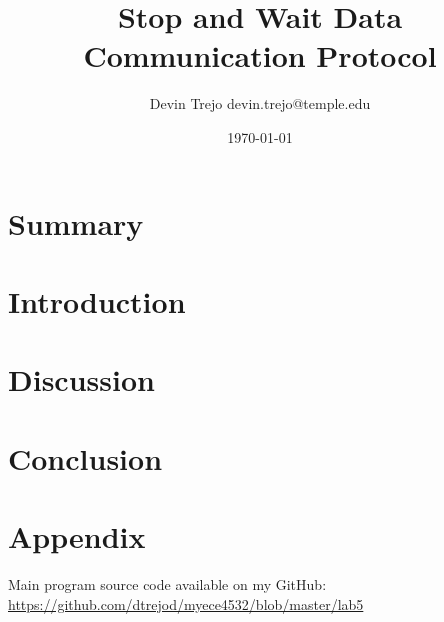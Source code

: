 \documentclass[12pt]{article}
\begin{document}
\title{Stop and Wait Data Communication Protocol}
\author{Devin Trejo \tabularnewline devin.trejo@temple.edu }
\date{\today}
\maketitle

\section{Summary}
\label{sect:summary}


\section{Introduction}
\label{sect:intro}


\section{Discussion}
\label{sect:discussion}



\section{Conclusion}
\label{sect:conclusion} 





\section*{Appendix}
\label{sect:appendix}
Main program source code available on my GitHub: \\
\url{https://github.com/dtrejod/myece4532/blob/master/lab5}
\end{document}
